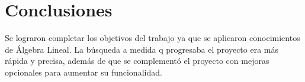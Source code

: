 \documentclass [a4paper,12pt]{article}
\begin{document}
\section{Conclusiones}\label {sec:concl}
Se lograron completar los objetivos del trabajo ya que se aplicaron conocimientos de Álgebra Lineal. La búsqueda a medida q progresaba el proyecto era más rápida y precisa, además de que se complementó el proyecto con mejoras opcionales para aumentar su funcionalidad.
\end{document}
